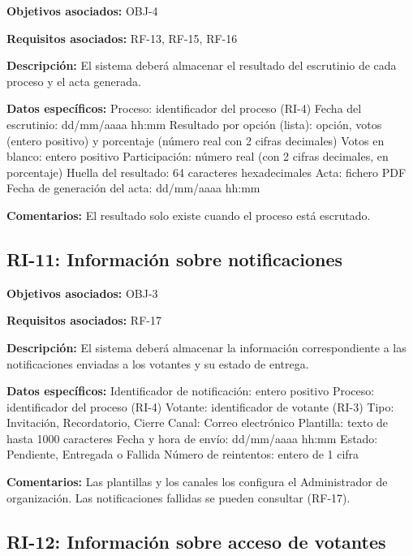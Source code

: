 \textbf{Objetivos asociados:} OBJ-4\par
\textbf{Requisitos asociados:} RF-13, RF-15, RF-16\par
\textbf{Descripción:} El sistema deberá almacenar el resultado del escrutinio de cada proceso y el acta generada.\par
\textbf{Datos específicos:} Proceso: identificador del proceso (RI-4) Fecha del escrutinio: dd/mm/aaaa hh:mm Resultado por opción (lista): opción, votos (entero positivo) y porcentaje (número real con 2 cifras decimales) Votos en blanco: entero positivo Participación: número real (con 2 cifras decimales, en porcentaje) Huella del resultado: 64 caracteres hexadecimales Acta: fichero PDF Fecha de generación del acta: dd/mm/aaaa hh:mm\par
\textbf{Comentarios:} El resultado solo existe cuando el proceso está escrutado.\par

\subsection{RI-11: Información sobre notificaciones}

\textbf{Objetivos asociados:} OBJ-3\par
\textbf{Requisitos asociados:} RF-17\par
\textbf{Descripción:} El sistema deberá almacenar la información correspondiente a las notificaciones enviadas a los votantes y su estado de entrega.\par
\textbf{Datos específicos:} Identificador de notificación: entero positivo Proceso: identificador del proceso (RI-4) Votante: identificador de votante (RI-3) Tipo: Invitación, Recordatorio, Cierre Canal: Correo electrónico Plantilla: texto de hasta 1000 caracteres Fecha y hora de envío: dd/mm/aaaa hh:mm Estado: Pendiente, Entregada o Fallida Número de reintentos: entero de 1 cifra\par
\textbf{Comentarios:} Las plantillas y los canales los configura el Administrador de organización. Las notificaciones fallidas se pueden consultar (RF-17).\par

\subsection{RI-12: Información sobre acceso de votantes}

